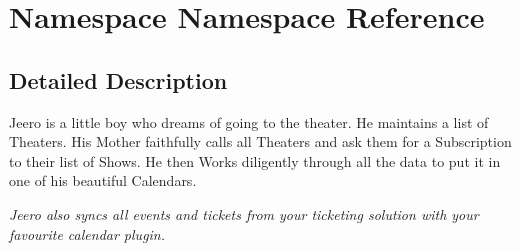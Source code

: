 \hypertarget{namespaceNamespace}{}\section{Namespace Namespace Reference}
\label{namespaceNamespace}


\subsection{Detailed Description}
Jeero is a little boy who dreams of going to the theater. He maintains a list of Theaters. His Mother faithfully calls all Theaters and ask them for a Subscription to their list of Shows. He then Works diligently through all the data to put it in one of his beautiful Calendars.

{\itshape Jeero also syncs all events and tickets from your ticketing solution with your favourite calendar plugin.} 